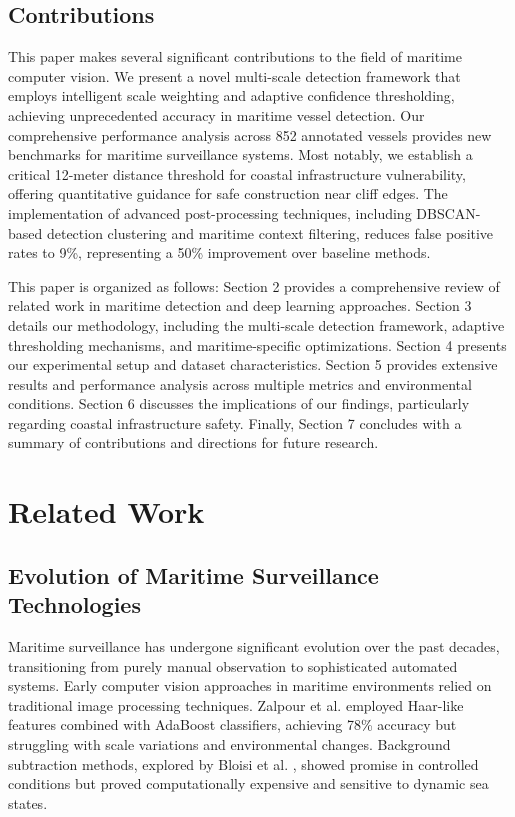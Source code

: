\documentclass[10pt]{article}
\begin{document}
\subsection{Contributions}

This paper makes several significant contributions to the field of maritime computer vision. We present a novel multi-scale detection framework that employs intelligent scale weighting and adaptive confidence thresholding, achieving unprecedented accuracy in maritime vessel detection. Our comprehensive performance analysis across 852 annotated vessels provides new benchmarks for maritime surveillance systems. Most notably, we establish a critical 12-meter distance threshold for coastal infrastructure vulnerability, offering quantitative guidance for safe construction near cliff edges. The implementation of advanced post-processing techniques, including DBSCAN-based detection clustering and maritime context filtering, reduces false positive rates to 9\%, representing a 50\% improvement over baseline methods.

This paper is organized as follows: Section 2 provides a comprehensive review of related work in maritime detection and deep learning approaches. Section 3 details our methodology, including the multi-scale detection framework, adaptive thresholding mechanisms, and maritime-specific optimizations. Section 4 presents our experimental setup and dataset characteristics. Section 5 provides extensive results and performance analysis across multiple metrics and environmental conditions. Section 6 discusses the implications of our findings, particularly regarding coastal infrastructure safety. Finally, Section 7 concludes with a summary of contributions and directions for future research.

\section{Related Work}

\subsection{Evolution of Maritime Surveillance Technologies}

Maritime surveillance has undergone significant evolution over the past decades, transitioning from purely manual observation to sophisticated automated systems. Early computer vision approaches in maritime environments relied on traditional image processing techniques. Zalpour et al. \cite{zalpour2013vessel} employed Haar-like features combined with AdaBoost classifiers, achieving 78\% accuracy but struggling with scale variations and environmental changes. Background subtraction methods, explored by Bloisi et al. \cite{bloisi2014background}, showed promise in controlled conditions but proved computationally expensive and sensitive to dynamic sea states.
\end{document}
